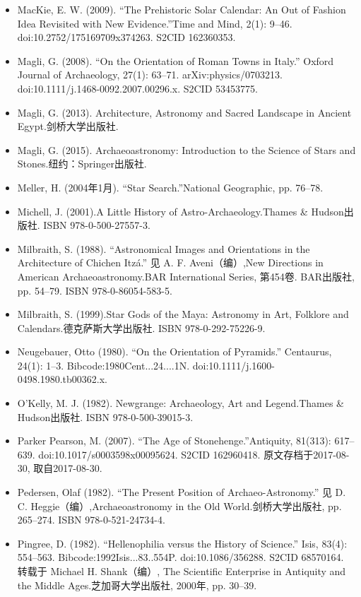 \begin{itemize}
    \item MacKie, E. W. (2009). “The Prehistoric Solar Calendar: An Out of Fashion Idea Revisited with New Evidence.”Time and Mind, 2(1): 9–46. doi:10.2752/175169709x374263. S2CID 162360353.
    \item Magli, G. (2008). “On the Orientation of Roman Towns in Italy.” Oxford Journal of Archaeology, 27(1): 63–71. arXiv:physics/0703213. doi:10.1111/j.1468-0092.2007.00296.x. S2CID 53453775.
    \item Magli, G. (2013). Architecture, Astronomy and Sacred Landscape in Ancient Egypt.剑桥大学出版社.
    \item Magli, G. (2015). Archaeoastronomy: Introduction to the Science of Stars and Stones.纽约：Springer出版社.
    \item Meller, H. (2004年1月). “Star Search.”National Geographic, pp. 76–78.
    \item Michell, J. (2001).A Little History of Astro-Archaeology.Thames \& Hudson出版社. ISBN 978-0-500-27557-3.
    \item Milbraith, S. (1988). “Astronomical Images and Orientations in the Architecture of Chichen Itzá.” 见 A. F. Aveni（编）,New Directions in American Archaeoastronomy.BAR International Series, 第454卷. BAR出版社, pp. 54–79. ISBN 978-0-86054-583-5.
    \item Milbraith, S. (1999).Star Gods of the Maya: Astronomy in Art, Folklore and Calendars.德克萨斯大学出版社. ISBN 978-0-292-75226-9.
    \item Neugebauer, Otto (1980). “On the Orientation of Pyramids.” Centaurus, 24(1): 1–3. Bibcode:1980Cent...24....1N. doi:10.1111/j.1600-0498.1980.tb00362.x.
    \item O’Kelly, M. J. (1982). Newgrange: Archaeology, Art and Legend.Thames \& Hudson出版社. ISBN 978-0-500-39015-3.
    \item Parker Pearson, M. (2007). “The Age of Stonehenge.”Antiquity, 81(313): 617–639. doi:10.1017/s0003598x00095624. S2CID 162960418. 原文存档于2017-08-30, 取自2017-08-30.
    \item Pedersen, Olaf (1982). “The Present Position of Archaeo-Astronomy.” 见 D. C. Heggie（编）,Archaeoastronomy in the Old World.剑桥大学出版社, pp. 265–274. ISBN 978-0-521-24734-4.
    \item Pingree, D. (1982). “Hellenophilia versus the History of Science.” Isis, 83(4): 554–563. Bibcode:1992Isis...83..554P. doi:10.1086/356288. S2CID 68570164. 转载于 Michael H. Shank（编）, The Scientific Enterprise in Antiquity and the Middle Ages.芝加哥大学出版社, 2000年, pp. 30–39.

\end{itemize}
